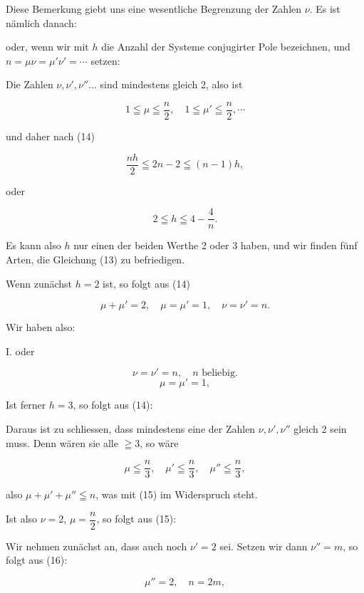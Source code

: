 Diese Bemerkung giebt uns eine wesentliche Begrenzung der Zahlen $\nu$. Es ist nämlich danach:


oder, wenn wir mit $h$ die Anzahl der Systeme conjugirter Pole bezeichnen, und $n = \mu \nu = \mu' \nu' = \cdots$ setzen:


Die Zahlen $\nu, \nu', \nu'' \ldots$ sind mindestens gleich 2, also ist

\[ 1 \leqq \mu \leqq \frac{n}{2}, \quad 1 \leqq \mu' \leqq \frac{n}{2}, \cdots \]

und daher nach (14)

\[ \frac{nh}{2} \leqq 2n - 2 \leqq (n-1)h, \]

oder

\[ 2 \leqq h \leqq 4 - \frac{4}{n}. \]

Es kann also $h$ nur einen der beiden Werthe 2 oder 3 haben, und wir finden fünf Arten, die Gleichung (13) zu befriedigen.

Wenn zunächst $h = 2$ ist, so folgt aus (14)

\[ \mu + \mu' = 2, \quad \mu = \mu' = 1, \quad \nu = \nu' = n. \]

Wir haben also:

I.  oder 

\[ \nu = \nu' = n, \quad n \text{ beliebig.} \]
\[ \mu = \mu' = 1, \]

Ist ferner $h = 3$, so folgt aus (14):


Daraus ist zu schliessen, dass mindestens eine der Zahlen $\nu, \nu', \nu''$ gleich 2 sein muss. Denn wären sie alle $\geqq 3$, so wäre

\[ \mu \leqq \frac{n}{3}, \quad \mu' \leqq \frac{n}{3}, \quad \mu'' \leqq \frac{n}{3}, \]

also $\mu + \mu' + \mu'' \leqq n$, was mit (15) im Widerspruch steht.

Ist also $\nu = 2$, $\mu = \dfrac{n}{2}$, so folgt aus (15):


Wir nehmen zunächst an, dass auch noch $\nu' = 2$ sei. Setzen wir dann $\nu'' = m$, so folgt aus (16):

\[ \mu'' = 2, \quad n = 2m, \]
